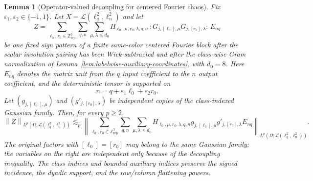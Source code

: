 \documentclass[10pt]{amsart}
\numberwithin{equation}{section}
\theoremstyle{plain}
\newtheorem{lemma}[theorem]{Lemma}
\theoremstyle{definition}
\theoremstyle{remark}
\begin{document}
\begin{lemma}[Operator-valued decoupling for centered Fourier chaos]\label{lem:operator-valued-fourier-decoupling}
Fix $\varepsilon_1,\varepsilon_2\in\{-1,1\}$.  Let $X=\mathcal L(\ell_q^2,\ell_n^2)$ and let
\[
        Z=\sum_{\ell_0,r_0\in\mathbb Z^3_{\mathrm{rep}}}
        \sum_{q,n}\sum_{\mu,\lambda\le d_0}
        H_{\ell_0,\mu,r_0,\lambda,q,n}\,
        :G_{j,[\ell_0],\mu}G_{j,[r_0],\lambda}:\,E_{nq}
\]
be one fixed sign pattern of a finite same-color centered Fourier block after the scalar involution pairing has been Wick-subtracted and after the class-wise Gram normalization of Lemma~\ref{lem:labelwise-auxiliary-coordinates}, with $d_0=8$.  Here $E_{nq}$ denotes the matrix unit from the $q$ input coefficient to the $n$ output coefficient, and the deterministic tensor is supported on
\[
        n=q+\varepsilon_1\ell_0+\varepsilon_2r_0.
\]
Let $(g_{j,[\ell_0],\mu})$ and $(g'_{j,[r_0],\lambda})$ be independent copies of the class-indexed Gaussian family.  Then, for every $p\ge2$,
\begin{equation}\label{eq:operator-valued-fourier-decoupling}
\left\|Z\right\|_{L^p(\Omega;\mathcal L(\ell_q^2,\ell_n^2))}
\lesssim_p
\left\|
\sum_{\ell_0,r_0\in\mathbb Z^3_{\mathrm{rep}}}
\sum_{q,n}\sum_{\mu,\lambda\le d_0}
H_{\ell_0,\mu,r_0,\lambda,q,n}
g_{j,[\ell_0],\mu}g'_{j,[r_0],\lambda}E_{nq}
\right\|_{L^p(\Omega;\mathcal L(\ell_q^2,\ell_n^2))}.
\end{equation}
The original factors with $[\ell_0]=[r_0]$ may belong to the same Gaussian family; the variables on the right are independent only because of the decoupling inequality.  The class indices and bounded auxiliary indices preserve the signed incidence, the dyadic support, and the row/column flattening powers.
\end{lemma}
\end{document}
